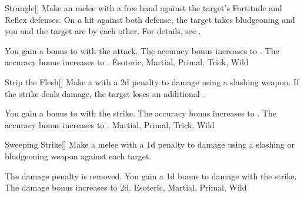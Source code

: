 \lowercase{\hypertarget{maneuver:Strangle}{}}\label{maneuver:Strangle}
\hypertarget{maneuver:Strangle}{}
\begin{freeability}[Rank 1]{Strangle}[]
Make an melee  with a free hand against the target's Fortitude and Reflex defenses.
On a hit against both defense, the target takes bludgeoning  and you and the target are  by each other.
For details, see .

\rankline
{} You gain a  bonus to  with the attack.
 The accuracy bonus increases to .
 The accuracy bonus increases to .
 Esoteric, Martial, Primal, Trick, Wild
\end{freeability}
\vspace{0.25em}



\lowercase{\hypertarget{maneuver:Strip the Flesh}{}}\label{maneuver:Strip the Flesh}
\hypertarget{maneuver:Strip the Flesh}{}
\begin{freeability}[Rank 1]{Strip the Flesh}[]
Make a  with a \minus2d penalty to damage using a slashing weapon.
If the strike deals damage, the target loses an additional .

\rankline
{} You gain a  bonus to  with the strike.
 The accuracy bonus increases to .
 The accuracy bonus increases to .
 Martial, Primal, Trick, Wild
\end{freeability}
\vspace{0.25em}



\lowercase{\hypertarget{maneuver:Sweeping Strike}{}}\label{maneuver:Sweeping Strike}
\hypertarget{maneuver:Sweeping Strike}{}
\begin{freeability}[Rank 1]{Sweeping Strike}[]
Make a melee  with a \minus1d penalty to damage using a slashing or bludgeoning weapon against each target.

\rankline
{} The damage penalty is removed.
 You gain a \plus1d bonus to damage with the strike.
 The damage bonus increases to \plus2d.
 Esoteric, Martial, Primal, Wild
\end{freeability}
\vspace{0.25em}




